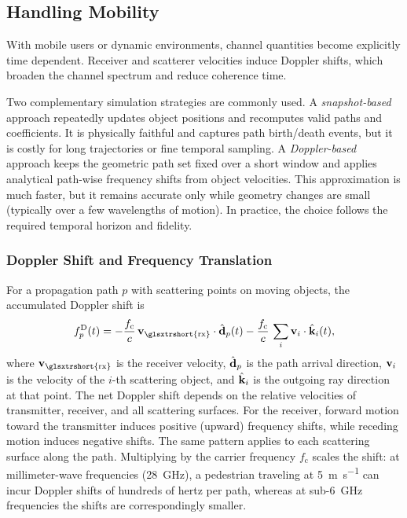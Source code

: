 \subsection{Handling Mobility}

With mobile users or dynamic environments, channel quantities become explicitly time dependent. Receiver and scatterer velocities induce Doppler shifts, which broaden the channel spectrum and reduce coherence time.

Two complementary simulation strategies are commonly used. A \emph{snapshot-based} approach repeatedly updates object positions and recomputes valid paths and coefficients. It is physically faithful and captures path birth/death events, but it is costly for long trajectories or fine temporal sampling. A \emph{Doppler-based} approach keeps the geometric path set fixed over a short window and applies analytical path-wise frequency shifts from object velocities. This approximation is much faster, but it remains accurate only while geometry changes are small (typically over a few \glspl{wavelength} of motion). In practice, the choice follows the required temporal horizon and fidelity.

\subsubsection{Doppler Shift and Frequency Translation}

For a propagation path $p$ with scattering points on moving objects, the accumulated Doppler shift is
\begin{equation}
  f_{p}^{\text{D}}(t) = -\frac{f_{\text{c}}}{c}\,\bsup{v}_{\text{\glsxtrshort{rx}}} \cdot \uvec{d}_p(t) - \frac{f_{\text{c}}}{c}\,\sum_i \bsup{v}_i \cdot \uvec{k}_i(t),
\end{equation}
where $\bsup{v}_{\text{\glsxtrshort{rx}}}$ is the receiver velocity, $\hat{\mathbf{d}}_p$ is the path arrival direction, $\mathbf{v}_i$ is the velocity of the $i$-th scattering object, and $\hat{\mathbf{k}}_i$ is the outgoing ray direction at that point. The net Doppler shift depends on the relative velocities of transmitter, receiver, and all scattering surfaces. For the receiver, forward motion toward the transmitter induces positive (upward) frequency shifts, while receding motion induces negative shifts. The same pattern applies to each scattering surface along the path. Multiplying by the carrier frequency $f_{\text{c}}$ scales the shift: at millimeter-wave frequencies (\qty{28}{\giga\hertz}), a pedestrian traveling at \qty{5}{\meter\per\second} can incur Doppler shifts of hundreds of hertz per path, whereas at sub-\qty{6}{\giga\hertz} frequencies the shifts are correspondingly smaller.

